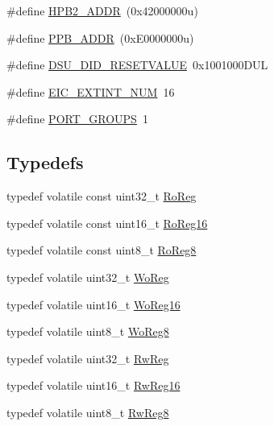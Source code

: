 \begin{DoxyCompactItemize}
\item 
\#define \mbox{\hyperlink{group___s_a_m_d21_e15_a__definitions_gaef42fa53ddf169a2a50be70d29f73571}{H\+P\+B2\+\_\+\+A\+D\+DR}}~(0x42000000u)
\item 
\#define \mbox{\hyperlink{group___s_a_m_d21_e15_a__definitions_ga8895d0a3a9a3126cc44330f86c8ce564}{P\+P\+B\+\_\+\+A\+D\+DR}}~(0x\+E0000000u)
\item 
\#define \mbox{\hyperlink{group___s_a_m_d21_e15_a__definitions_gada75131d542c9e1966238f5488f89bd6}{D\+S\+U\+\_\+\+D\+I\+D\+\_\+\+R\+E\+S\+E\+T\+V\+A\+L\+UE}}~0x1001000\+D\+UL
\item 
\#define \mbox{\hyperlink{group___s_a_m_d21_e15_a__definitions_ga88ebc38c95506296f5d21f82476296ae}{E\+I\+C\+\_\+\+E\+X\+T\+I\+N\+T\+\_\+\+N\+UM}}~16
\item 
\#define \mbox{\hyperlink{group___s_a_m_d21_e15_a__definitions_gab9243ffe03a1dc631b57a495b4b3d467}{P\+O\+R\+T\+\_\+\+G\+R\+O\+U\+PS}}~1
\end{DoxyCompactItemize}
\subsection*{Typedefs}
\begin{DoxyCompactItemize}
\item 
typedef volatile const uint32\+\_\+t \mbox{\hyperlink{group___s_a_m_d21_e15_a__definitions_ga5d556f8391af4141be23f7334ac9dd68}{Ro\+Reg}}
\item 
typedef volatile const uint16\+\_\+t \mbox{\hyperlink{group___s_a_m_d21_e15_a__definitions_gaebf6e33c2d49a802e06e22a95ea9d0d0}{Ro\+Reg16}}
\item 
typedef volatile const uint8\+\_\+t \mbox{\hyperlink{group___s_a_m_d21_e15_a__definitions_ga0d957f1433aaf5d70e4dc2b68288442d}{Ro\+Reg8}}
\item 
typedef volatile uint32\+\_\+t \mbox{\hyperlink{group___s_a_m_d21_e15_a__definitions_gac0f96d4e8018367b38f527007cf0eafd}{Wo\+Reg}}
\item 
typedef volatile uint16\+\_\+t \mbox{\hyperlink{group___s_a_m_d21_e15_a__definitions_ga0ab0e5f6c8301aa1c2068e511d854094}{Wo\+Reg16}}
\item 
typedef volatile uint8\+\_\+t \mbox{\hyperlink{group___s_a_m_d21_e15_a__definitions_ga5e336e5a36ee12ebeafb021108e5275b}{Wo\+Reg8}}
\item 
typedef volatile uint32\+\_\+t \mbox{\hyperlink{group___s_a_m_d21_e15_a__definitions_gacf1496e3bbe303e55f627fc7558a68c7}{Rw\+Reg}}
\item 
typedef volatile uint16\+\_\+t \mbox{\hyperlink{group___s_a_m_d21_e15_a__definitions_gacce07556c80fc352ae607f225f19fed5}{Rw\+Reg16}}
\item 
typedef volatile uint8\+\_\+t \mbox{\hyperlink{group___s_a_m_d21_e15_a__definitions_gae361754be775bb192f85821d3ab33c17}{Rw\+Reg8}}
\end{DoxyCompactItemize}


